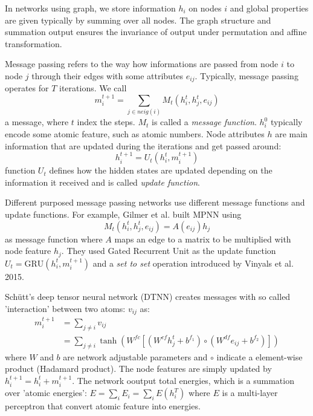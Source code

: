 \documentclass{IEEEtran}
\begin{document}
In networks using graph, we store information $h_i$ on nodes $i$ and global properties are given typically
by summing over all nodes. The graph structure and summation output ensures the invariance of output
under permutation and affine transformation. 

Message passing refers to the way how informations are passed from node $i$ to node $j$ through their 
edges with some attributes $e_{ij}$. Typically, message passing operates for $T$ iterations. We call
\begin{equation}
    m_{i}^{t+1} = \sum_{j\in neig(i)} M_t(h^t_i, h^t_j, e_{ij})
\end{equation}
a message, 
where $t$ index the steps. $M_t$ is called a \emph{message function}. $h^0_i$ typically encode some atomic
feature, such as atomic numbers. 
Node attributes $h$ are main information that are updated during the iterations and get passed around:
\begin{equation}
    h^{t+1}_i = U_t(h_i^t, m_{i}^{t+1})
\end{equation}
function $U_t$ defines how the hidden states are updated depending on the information it received and is called
\emph{update function}. 

Different purposed message passing networks use different message functions and update functions. 
For example, Gilmer et al. built MPNN using 
\begin{equation}
    M_t(h^t_i, h^t_j, e_{ij}) = A(e_{ij}) h_j
\end{equation}
as message function where $A$ maps an edge to a matrix to be multiplied with node feature $h_j$. They used 
Gated Recurrent Unit as the update function $U_t = \text{GRU}(h_i^t, m_i^{t+1})$ and a \emph{set to set} 
operation introduced by Vinyals et al. 2015. 

Sch\"{u}tt's deep tensor neural network (DTNN) creates messages with so called 'interaction' between two 
atoms: $v_{ij}$ as:
\begin{align}
    m_i^{t+1} &= \sum_{j\neq i} v_{ij} \\
            &= \sum_{j\neq i} \tanh \left( W^{fc}[ (W^{cf} h_j^t + b^{f_1}) \circ (W^{df} e_{ij} + b^{f_2}) ] \right)
\end{align}
where $W$ and $b$ are network adjustable parameters and $\circ$ indicate a element-wise product 
(Hadamard product). The node features are simply updated by $h_i^{t+1} = h_i^t + m_i^{t+1}$. 
The network ooutput total energies, which is a summation over 'atomic energies':
$E = \sum_i E_i = \sum_i E(h_i^T)$ where $E$ is a multi-layer perceptron that convert atomic feature 
into energies.
\end{document}
